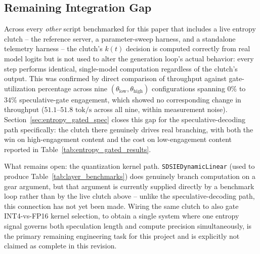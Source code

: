 \documentclass[10pt,journal,compsoc,twocolumn]{IEEEtran}
\begin{document}
\subsection{Remaining Integration Gap}
\label{sec:integration_gap}
Across every \textit{other} script benchmarked for this paper that includes a live entropy clutch -- the reference server, a parameter-sweep harness, and a standalone telemetry harness -- the clutch's $k(t)$ decision is computed correctly from real model logits but is not used to alter the generation loop's actual behavior: every step performs identical, single-model computation regardless of the clutch's output. This was confirmed by direct comparison of throughput against gate-utilization percentage across nine $(\theta_{\text{low}}, \theta_{\text{high}})$ configurations spanning $0\%$ to $34\%$ speculative-gate engagement, which showed no corresponding change in throughput ($51.1$--$51.8\text{ tok/s}$ across all nine, within measurement noise). Section~\ref{sec:entropy_gated_spec} closes this gap for the speculative-decoding path specifically: the clutch there genuinely drives real branching, with both the win on high-engagement content and the cost on low-engagement content reported in Table~\ref{tab:entropy_gated_results}.

What remains open: the quantization kernel path. \texttt{SDSIEDynamicLinear} (used to produce Table~\ref{tab:layer_benchmarks}) does genuinely branch computation on a gear argument, but that argument is currently supplied directly by a benchmark loop rather than by the live clutch above -- unlike the speculative-decoding path, this connection has not yet been made. Wiring the same clutch to also gate INT4-vs-FP16 kernel selection, to obtain a single system where one entropy signal governs both speculation length and compute precision simultaneously, is the primary remaining engineering task for this project and is explicitly not claimed as complete in this revision.

\end{document}

